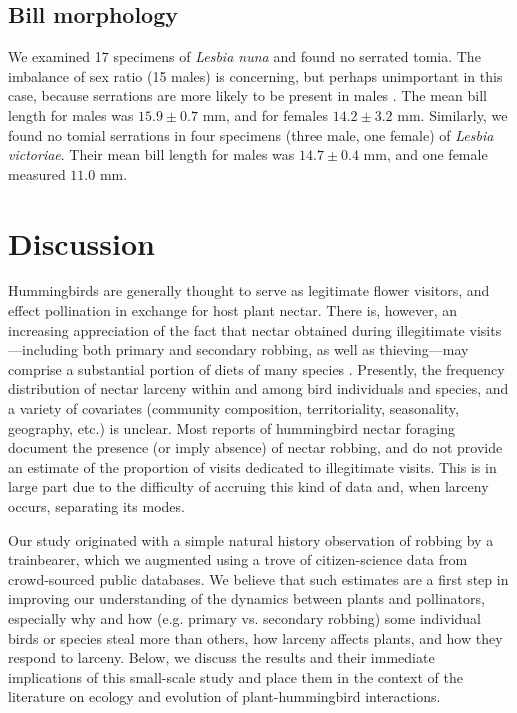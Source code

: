 \documentclass[fleqn,10pt,lineno]{wlpeerj}
\begin{document}
\subsection*{Bill morphology}
We examined 17 specimens of \textit{Lesbia nuna} and found no serrated tomia. %
The imbalance of sex ratio (15 males) is concerning, but perhaps unimportant in this case, because serrations are more likely to be present in males \citep{rico-guevara2019}. 
The mean bill length for males was $15.9 \pm 0.7$ mm, and for females $14.2 \pm 3.2$ mm. Similarly, we found no tomial serrations in four specimens (three male, one female) of \textit{Lesbia victoriae}. 
Their mean bill length for males was $14.7 \pm 0.4$ mm, and one female measured $11.0$ mm.


\section*{Discussion}

%
%
Hummingbirds are generally thought to serve as legitimate flower visitors, and effect pollination in exchange for host plant nectar. 
There is, however, an increasing appreciation of the fact that nectar obtained during illegitimate visits---including both primary and secondary robbing, as well as thieving---may comprise a substantial portion of diets of many species \citep{lara2001,irwin2010,boehm2018}. 
Presently, the frequency distribution of nectar larceny within and among bird individuals and species, and a variety of covariates (community composition, territoriality, seasonality, geography, etc.) is unclear. 
Most reports of hummingbird nectar foraging document the presence (or imply absence) of nectar robbing, and do not provide an estimate of the proportion of visits dedicated to illegitimate visits. 
This is in large part due to the difficulty of accruing this kind of data and, when larceny occurs, separating its modes.  

%
%
Our study originated with a simple natural history observation of robbing by a trainbearer, which we augmented using a trove of citizen-science data from crowd-sourced public databases. We believe that such estimates are a first step in improving our understanding of the dynamics between plants and pollinators, especially why and how (e.g. primary vs. secondary robbing) some individual birds or species steal more than others, how larceny affects plants, and how they respond to larceny. Below, we discuss the results and their immediate implications of this small-scale study and place them in the context of the literature on ecology and evolution of plant-hummingbird interactions.
\end{document}
